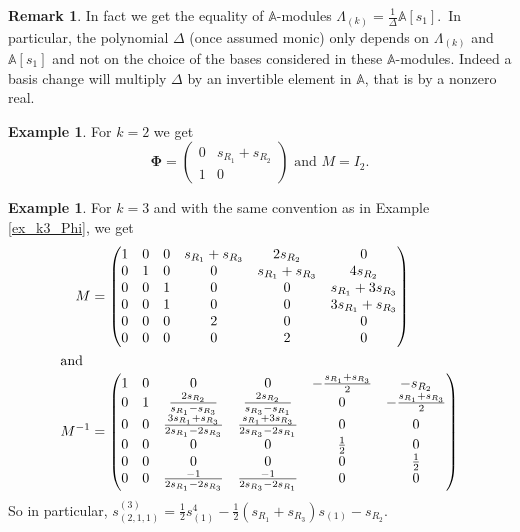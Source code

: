 \documentclass[10pt,a4paper]{amsart}
\theoremstyle{definition}
\newtheorem{rema}[theorem]{Remark}
\newtheorem{exam}[theorem]{Example}
\begin{document}
\begin{rema}
In fact we get the equality of $\mathbb{A}$-modules $\Lambda_{(k)}=\frac
{1}{\Delta}\mathbb{A}[s_{1}]$.\ In particular, the polynomial $\Delta$ (once
assumed monic) only depends on $\Lambda_{(k)}$ and $\mathbb{A}[s_{1}]$ and not
on the choice of the bases considered in these $\mathbb{A}$-modules. Indeed a
basis change will multiply $\Delta$ by an invertible element in $\mathbb{A}$,
that is by a nonzero real.
\end{rema}

\begin{exam}
For $k=2$ we get
\[
\boldsymbol{\Phi}=\left(
\begin{matrix}
0 & s_{R_{1}}+s_{R_{2}}\\
1 & 0
\end{matrix}
\right) \text{ and }M=I_{2}.
\]

\end{exam}

\begin{exam}
\label{Examk=3}For $k=3$ and with the same convention as in Example
\ref{ex_k3_Phi}, we get%
\begin{align*}
M&=\left(
\begin{matrix}
1 & 0 & 0 & s_{R_{1}}+s_{R_{3}} & 2s_{R_{2}} & 0\\
0 & 1 & 0 & 0 & s_{R_{1}}+s_{R_{3}} & 4s_{R_{2}}\\
0 & 0 & 1 & 0 & 0 & s_{R_{1}}+3s_{R_{3}}\\
0 & 0 & 1 & 0 & 0 & 3s_{R_{1}}+s_{R_{3}}\\
0 & 0 & 0 & 2 & 0 & 0\\
0 & 0 & 0 & 0 & 2 & 0
\end{matrix}
\right) \\
\intertext{and}
M^{-1}&=\left(
\begin{matrix}
1 & 0 & 0 & 0 & -\frac{s_{R_{1}}+s_{R_{3}}}{2} & -s_{R_{2}}\\
0 & 1 & \frac{2s_{R_{2}}}{s_{R_{1}}-s_{R_{3}}} & \frac{2s_{R_{2}}}{s_{R_{3}%
}-s_{R_{1}}} & 0 & -\frac{s_{R_{1}}+s_{R_{3}}}{2}\\
0 & 0 & \frac{3s_{R_{1}}+s_{R_{3}}}{2s_{R_{1}}-2s_{R_{3}}} & \frac{s_{R_{1}%
}+3s_{R_{3}}}{2s_{R_{3}}-2s_{R_{1}}} & 0 & 0\\
0 & 0 & 0 & 0 & \frac{1}{2} & 0\\
0 & 0 & 0 & 0 & 0 & \frac{1}{2}\\
0 & 0 & \frac{-1}{2s_{R_{1}}-2s_{R_{3}}} & \frac{-1}{2s_{R_{3}}-2s_{R_{1}}} &
0 & 0
\end{matrix}
\right) %
\end{align*}
So in particular, $s_{(2,1,1)}^{(3)}=\frac{1}{2}s_{(1)}^{4}-\frac{1}%
{2}(s_{R_{1}}+s_{R_{3}})s_{(1)}-s_{R_{2}}$.
\end{exam}
\end{document}
